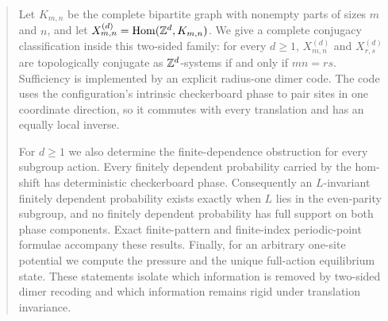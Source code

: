 \begin{abstract}
Let $K_{m,n}$ be the complete bipartite graph with nonempty parts of sizes
$m$ and $n$, and let
$X_{m,n}^{(d)}=\Hom(\Z^d,K_{m,n})$.  We give a complete conjugacy
classification inside this two-sided family: for every $d\geq 1$,
$X_{m,n}^{(d)}$ and $X_{r,s}^{(d)}$ are topologically conjugate as
$\Z^d$-systems if and only if $mn=rs$.  Sufficiency is implemented by an
explicit radius-one dimer code.  The code uses the configuration's intrinsic
checkerboard phase to pair sites in one coordinate direction, so it commutes
with every translation and has an equally local inverse.

For $d\geq1$ we also determine the finite-dependence obstruction for every
subgroup action.  Every finitely dependent probability carried by the
hom-shift has deterministic checkerboard phase.  Consequently an
$L$-invariant finitely dependent probability exists exactly when
$L$ lies in the even-parity subgroup, and no finitely dependent probability
has full support on both phase components.  Exact finite-pattern and
finite-index periodic-point formulae accompany these results.  Finally, for
an arbitrary one-site potential we compute the pressure and the unique
full-action equilibrium state.  These statements isolate which information
is removed by two-sided dimer recoding and which information remains rigid
under translation invariance.
\end{abstract}
